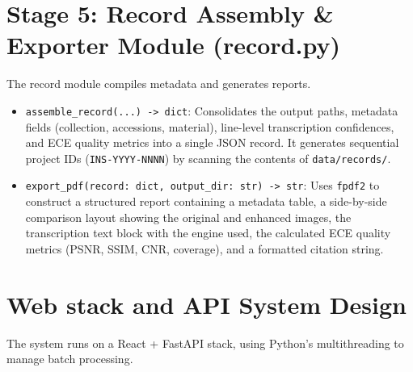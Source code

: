 \section{Stage 5: Record Assembly \& Exporter Module (record.py)}

The record module compiles metadata and generates reports.

\begin{itemize}
	\item \texttt{assemble\_record(...) -> dict}:
	Consolidates the output paths, metadata fields (collection, accessions, material), line-level transcription confidences, and ECE quality metrics into a single JSON record. It generates sequential project IDs (\texttt{INS-YYYY-NNNN}) by scanning the contents of \texttt{data/records/}.
	
	\item \texttt{export\_pdf(record: dict, output\_dir: str) -> str}:
	Uses \texttt{fpdf2} to construct a structured report containing a metadata table, a side-by-side comparison layout showing the original and enhanced images, the transcription text block with the engine used, the calculated ECE quality metrics (PSNR, SSIM, CNR, coverage), and a formatted citation string.
\end{itemize}

\section{Web stack and API System Design}

The system runs on a React + FastAPI stack, using Python's multithreading to manage batch processing.

